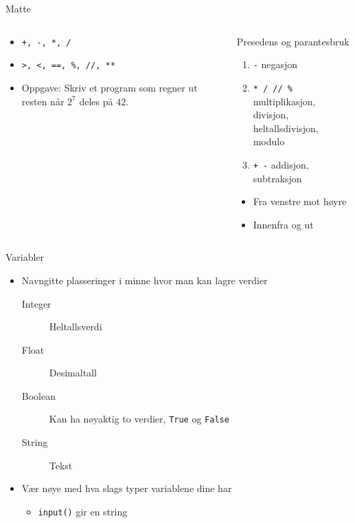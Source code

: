 \documentclass[screen, aspectratio=169]{beamer}
\begin{document}
\begin{frame}[fragile]{Matte}
	\begin{columns}
		\begin{column}{.5\textwidth}
			\begin{itemize}
				\item \lstinline|+, -, *, /|
				\item \lstinline|>, <, ==, %, //, **|
				\vspace{2em}
				\item<2-> Oppgave: Skriv et program som regner ut resten når $2^7$ deles på $42$.
			\end{itemize}
		\end{column}
		\begin{column}{.4\textwidth}
			\footnotesize
			\begin{block}{\small Presedens og parantesbruk}
				\begin{enumerate}
					\item \lstinline|-| \hfill negasjon
					\item \lstinline|* / // %| \hfill multiplikasjon, divisjon, \\\hfill heltallsdivisjon, modulo
					\item \lstinline|+ -| \hfill addisjon, subtraksjon
				\end{enumerate}
				\begin{itemize}
					\item Fra venstre mot høyre
					\item Innenfra og ut
				\end{itemize}
			\end{block}
		\end{column}
	\end{columns}
\end{frame}

\begin{frame}[fragile]{Variabler}
	\begin{itemize}
		\item Navngitte plasseringer i minne hvor man kan lagre verdier
		\begin{description}
			\item[Integer] Heltallsverdi
			\item[Float] Desimaltall
			\item[Boolean] Kan ha nøyaktig to verdier, \lstinline|True| og \lstinline|False|
			\item[String] Tekst
		\end{description}
		\item Vær nøye med hva slags typer variablene dine har
		\begin{itemize}
			\item \lstinline|input()| gir en string
		\end{itemize}
	\end{itemize}
\end{frame}
\end{document}
